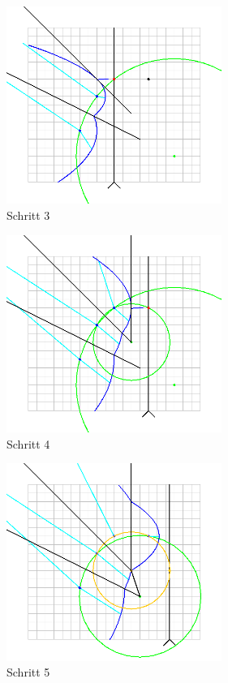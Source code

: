 \begin{figure}[h]
\begin{center}
\includegraphics[width=7cm]{capture3}
\end{center}
\caption{Schritt 3}
\label{fig:c3}
\end{figure}

\begin{figure}[h]
\begin{center}
\includegraphics[width=7cm]{capture4}
\end{center}
\caption{Schritt 4}
\label{fig:c4}
\end{figure}

\begin{figure}[h]
\begin{center}
\includegraphics[width=7cm]{capture5}
\end{center}
\caption{Schritt 5}
\label{fig:c5}
\end{figure}

